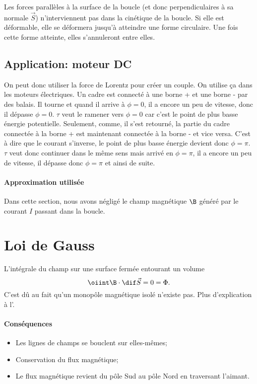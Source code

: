 Les forces parallèles à la surface de la boucle
(et donc perpendiculaires à sa normale $\vec{S}$) n'interviennent pas
dans la cinétique de la boucle.
Si elle est déformable,
elle se déformera jusqu'à atteindre une forme circulaire.
Une fois cette forme atteinte, elles s'annuleront entre elles.

\subsection{Application: moteur DC}
On peut donc utiliser la force de Lorentz pour créer un couple.
On utilise ça dans les moteurs électriques.
Un cadre est connecté à une borne + et une borne - par des balais.
Il tourne et quand il arrive à $\phi = 0$, il a encore un peu de vitesse,
donc il dépasse $\phi = 0$.
$\tau$ veut le ramener vers $\phi = 0$
car c'est le point de plus basse énergie potentielle.
Seulement, comme, il s'est retourné,
la partie du cadre connectée à la borne + est
maintenant connectée à la borne - et vice versa.
C'est à dire que le courant s'inverse,
le point de plus basse énergie devient donc $\phi = \pi$.
$\tau$ veut donc continuer dans le même sens mais arrivé en $\phi = \pi$,
il a encore un peu de vitesse, il dépasse donc $\phi = \pi$ et ainsi de suite.

\paragraph{Approximation utilisée}
Dans cette section, nous avons négligé le champ magnétique $\B$
généré par le courant $I$ passant dans la boucle.

\section{Loi de Gauss}
L'intégrale du champ sur une surface fermée entourant un volume
\[ \oiint \B \cdot \dif \vec S = 0 = \Phi. \]
C'est dû au fait qu'un monopôle magnétique isolé n'existe pas.
Plus d'explication à l'.
\paragraph{Conséquences}
\begin{itemize}
  \item Les lignes de champs se bouclent sur elles-mêmes;
  \item Conservation du flux magnétique;
  \item Le flux magnétique revient du pôle Sud
    au pôle Nord en traversant l'aimant.
\end{itemize}

